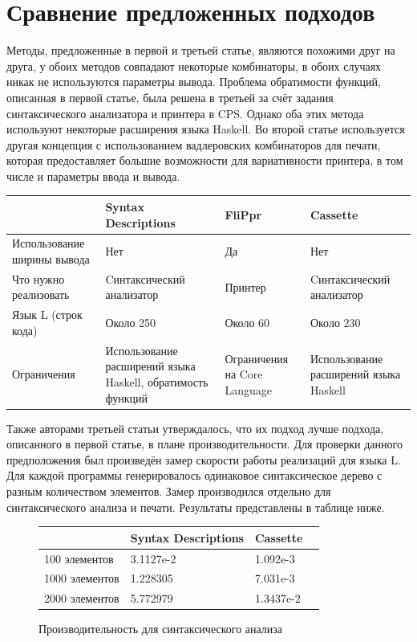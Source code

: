 \documentclass{matmex-diploma-custom}
\begin{document}
\section{Сравнение предложенных подходов}
Методы, предложенные в первой и третьей статье, являются похожими друг на друга, у обоих методов совпадают некоторые комбинаторы, в обоих случаях никак не используются параметры вывода. Проблема обратимости функций, описанная в первой статье, была решена в третьей за счёт задания синтаксического анализатора и принтера в CPS. Однако оба этих метода используют некоторые расширения языка Haskell. Во второй статье используется другая концепция с использованием вадлеровских комбинаторов для печати, которая предоставляет большие возможности для вариативности принтера, в том числе и параметры ввода и вывода.
\begin{center}
    \begin{tabular}{ | p{4cm} | p{4cm} | p{3cm} | p{4cm} |}
    \hline
      & Syntax Descriptions & FliPpr & Cassette \\ \hline
    Использование ширины вывода & Нет & Да & Нет \\ \hline
    Что нужно реализовать & Cинтаксический анализатор  & Принтер & Cинтаксический анализатор \\ \hline
    Язык L (строк кода) & Около 250 & Около 60 & Около 230 \\ \hline
    Ограничения & Использование расширений языка Haskell, обратимость функций & Ограничения на Core Language & Использование расширений языка Haskell\\
    \hline
    \end{tabular}
\end{center}

Также авторами третьей статьи утверждалось, что их подход лучше подхода, описанного в первой статье, в плане производительности. Для проверки данного предположения был произведён замер скорости работы реализаций для языка L.
Для каждой программы генерировалось одинаковое синтаксическое дерево с разным количеством элементов. Замер производился отдельно для синтаксического анализа и печати. Результаты представлены в таблице ниже.


\begin{figure}[ht]
\centering
\begin{center}
    \begin{tabular}{ | p{4cm} | p{4cm} | p{3cm} | p{4cm} |}
    \hline
      & Syntax Descriptions &  Cassette \\ \hline
    100 элементов  & 3.1127e-2 & 1.092e-3 \\ \hline
    1000 элементов & 1.228305 & 7.031e-3    \\ \hline
    2000 элементов & 5.772979 & 1.3437e-2 \\
    \hline
    \end{tabular}
\end{center}
\caption{Производительность для синтаксического анализа}
\end{figure}
\end{document}
